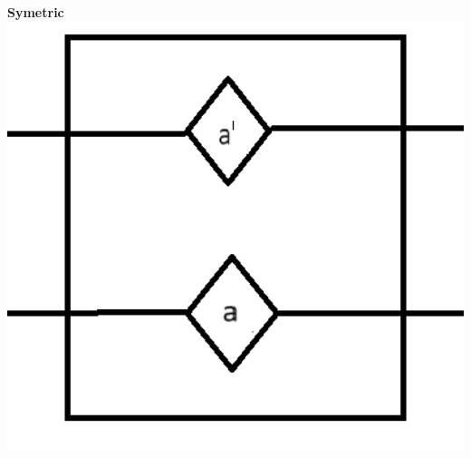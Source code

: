 \documentclass{beamer}
\begin{document}
\begin{frame}
\begin{minipage}[t]{0.32\textwidth}
  \end{minipage}
  \begin{minipage}[t]{0.232\textwidth}
    \textbf{Symetric}
    \includegraphics[width=1.3\textwidth]{res/SelfClosingSymetricDoor.png}
  \end{minipage}
\end{frame}
\end{document}
